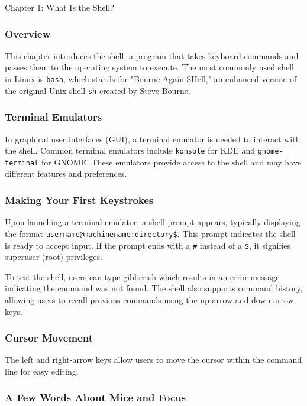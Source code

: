 \begin{notes}{Chapter 1: What Is the Shell?}
    \subsubsection*{Overview}

    This chapter introduces the shell, a program that takes keyboard commands and passes them to the operating system to execute. The most commonly used shell in Linux is \texttt{bash}, which stands 
    for "Bourne Again SHell," an enhanced version of the original Unix shell \texttt{sh} created by Steve Bourne.

    \subsubsection*{Terminal Emulators}

    In graphical user interfaces (GUI), a terminal emulator is needed to interact with the shell. Common terminal emulators include \texttt{konsole} for KDE and \texttt{gnome-terminal} for GNOME. 
    These emulators provide access to the shell and may have different features and preferences.

    \subsubsection*{Making Your First Keystrokes}

    Upon launching a terminal emulator, a shell prompt appears, typically displaying the format \texttt{username@machinename:directory\$}. This prompt indicates the shell is ready to accept input. 
    If the prompt ends with a \texttt{\#} instead of a \texttt{\$}, it signifies superuser (root) privileges.

    To test the shell, users can type gibberish which results in an error message indicating the command was not found. The shell also supports command history, allowing users to recall previous 
    commands using the up-arrow and down-arrow keys.

    \subsubsection*{Cursor Movement}

    The left and right-arrow keys allow users to move the cursor within the command line for easy editing. 

    \subsubsection*{A Few Words About Mice and Focus}


\end{notes}
